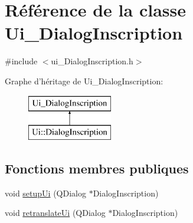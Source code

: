 \hypertarget{class_ui___dialog_inscription}{\section{Référence de la classe Ui\-\_\-\-Dialog\-Inscription}
\label{class_ui___dialog_inscription}
}


{\ttfamily \#include $<$ui\-\_\-\-Dialog\-Inscription.\-h$>$}

Graphe d'héritage de Ui\-\_\-\-Dialog\-Inscription\-:\begin{figure}[H]
\begin{center}
\leavevmode
\includegraphics[height=2.000000cm]{class_ui___dialog_inscription}
\end{center}
\end{figure}
\subsection*{Fonctions membres publiques}
\begin{DoxyCompactItemize}
\item 
void \hyperlink{class_ui___dialog_inscription_aac8f38192f3e2691f410ae201df0d742}{setup\-Ui} (Q\-Dialog $\ast$Dialog\-Inscription)
\item 
void \hyperlink{class_ui___dialog_inscription_ae1af8d7775047088b4a14746e457b66e}{retranslate\-Ui} (Q\-Dialog $\ast$Dialog\-Inscription)
\end{DoxyCompactItemize}
